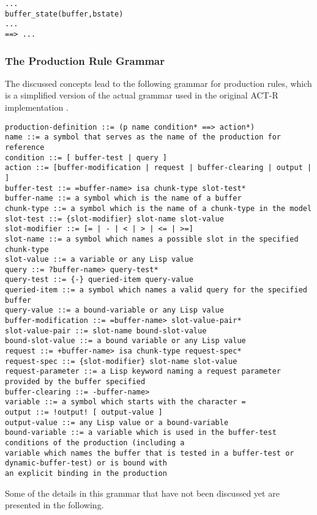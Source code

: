\begin{lstlisting}
...
buffer_state(buffer,bstate) 
...
==> ...
\end{lstlisting}






\subsubsection{The Production Rule Grammar}

The discussed concepts lead to the following grammar for production rules, which is a simplified version of the actual grammar used in the original ACT-R implementation \cite[p. 162]{actr_reference}. 


\begin{lstlisting}
production-definition ::= (p name condition* ==> action*)
name ::= a symbol that serves as the name of the production for reference
condition ::= [ buffer-test | query ]
action ::= [buffer-modification | request | buffer-clearing | output | ]
buffer-test ::= =buffer-name> isa chunk-type slot-test*
buffer-name ::= a symbol which is the name of a buffer
chunk-type ::= a symbol which is the name of a chunk-type in the model
slot-test ::= {slot-modifier} slot-name slot-value
slot-modifier ::= [= | - | < | > | <= | >=]
slot-name ::= a symbol which names a possible slot in the specified chunk-type
slot-value ::= a variable or any Lisp value
query ::= ?buffer-name> query-test*
query-test ::= {-} queried-item query-value
queried-item ::= a symbol which names a valid query for the specified buffer
query-value ::= a bound-variable or any Lisp value
buffer-modification ::= =buffer-name> slot-value-pair*
slot-value-pair ::= slot-name bound-slot-value
bound-slot-value ::= a bound variable or any Lisp value
request ::= +buffer-name> isa chunk-type request-spec*
request-spec ::= {slot-modifier} slot-name slot-value
request-parameter ::= a Lisp keyword naming a request parameter provided by the buffer specified
buffer-clearing ::= -buffer-name>
variable ::= a symbol which starts with the character =
output ::= !output! [ output-value ]
output-value ::= any Lisp value or a bound-variable
bound-variable ::= a variable which is used in the buffer-test conditions of the production (including a
variable which names the buffer that is tested in a buffer-test or dynamic-buffer-test) or is bound with
an explicit binding in the production
\end{lstlisting}

Some of the details in this grammar that have not been discussed yet are presented in the following.

